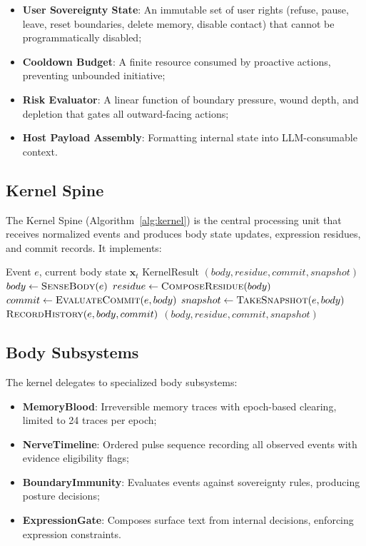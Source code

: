 \documentclass[10pt,twocolumn]{article}
\begin{document}
\begin{itemize}[nosep,leftmargin=*]
\item \textbf{User Sovereignty State}: An immutable set of user rights (refuse, pause, leave, reset boundaries, delete memory, disable contact) that cannot be programmatically disabled;
\item \textbf{Cooldown Budget}: A finite resource consumed by proactive actions, preventing unbounded initiative;
\item \textbf{Risk Evaluator}: A linear function of boundary pressure, wound depth, and depletion that gates all outward-facing actions;
\item \textbf{Host Payload Assembly}: Formatting internal state into LLM-consumable context.
\end{itemize}

\subsection{Kernel Spine}

The Kernel Spine (Algorithm~\ref{alg:kernel}) is the central processing unit that receives normalized events and produces body state updates, expression residues, and commit records. It implements:

\begin{algorithm}[t]
\caption{Kernel Spine Processing}
\label{alg:kernel}
\begin{algorithmic}[1]
\Require Event $e$, current body state $\mathbf{x}_t$
\Ensure KernelResult $(body, residue, commit, snapshot)$
\State $body \gets \textsc{SenseBody}(e)$ 
\State $residue \gets \textsc{ComposeResidue}(body)$
\State $commit \gets \textsc{EvaluateCommit}(e, body)$
\State $snapshot \gets \textsc{TakeSnapshot}(e, body)$
  \State $\textsc{RecordHistory}(e, body, commit)$
\EndIf
\State \Return $(body, residue, commit, snapshot)$
\end{algorithmic}
\end{algorithm}

\subsection{Body Subsystems}

The kernel delegates to specialized body subsystems:

\begin{itemize}[nosep,leftmargin=*]
\item \textbf{MemoryBlood}: Irreversible memory traces with epoch-based clearing, limited to 24 traces per epoch;
\item \textbf{NerveTimeline}: Ordered pulse sequence recording all observed events with evidence eligibility flags;
\item \textbf{BoundaryImmunity}: Evaluates events against sovereignty rules, producing posture decisions;
\item \textbf{ExpressionGate}: Composes surface text from internal decisions, enforcing expression constraints.
\end{itemize}
\end{document}
